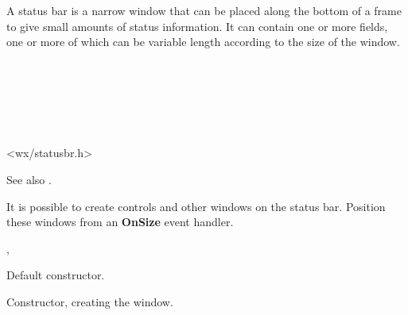 \section{}\label{wxstatusbar}

A status bar is a narrow window that can be placed along the bottom of a frame to give
small amounts of status information. It can contain one or more fields, one or more of which can
be variable length according to the size of the window.

\\
\\


\\
\\


<wx/statusbr.h>


\twocolwidtha{5cm}
\begin{twocollist}\itemsep=0pt
\end{twocollist}

See also .


It is possible to create controls and other windows on the status bar. Position these windows
from an {\bf OnSize} event handler.


, 


\label{wxstatusbarconstr}


Default constructor.


Constructor, creating the window.

